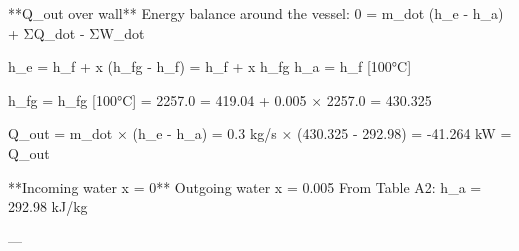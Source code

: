 **Q_out over wall**  
Energy balance around the vessel:  
0 = m_dot (h_e - h_a) + ΣQ_dot - ΣW_dot  

h_e = h_f + x (h_fg - h_f) = h_f + x h_fg  
h_a = h_f [100°C]  

h_fg = h_fg [100°C] = 2257.0  
= 419.04 + 0.005 × 2257.0 = 430.325  

Q_out = m_dot × (h_e - h_a) = 0.3 kg/s × (430.325 - 292.98) = -41.264 kW = Q_out  

**Incoming water x = 0**  
Outgoing water x = 0.005  
From Table A2:  
h_a = 292.98 kJ/kg  

---
